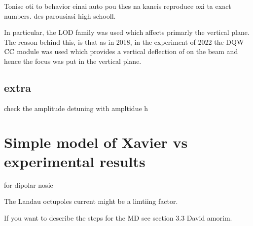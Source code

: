 Tonise oti to behavior einai auto pou thes na kaneis reproduce oxi ta exact numbers. des parousiasi high schooll.


In particular, the LOD family was used which affects primarly the vertical plane. The reason behind this, is that as in 2018, in the experiment of 2022 the DQW ${\mathrm{CC}}$ module was used which provides a vertical deflection of on the beam and hence the focus was put in the vertical plane.


\subsection{extra}
check the amplitude detuning with ampltidue
h%


\section{Simple model of Xavier vs experimental results}
for dipolar nosie


The Landau octupoles current might be a limtiing factor.


If you want to describe the steps for the MD see section 3.3 David amorim.